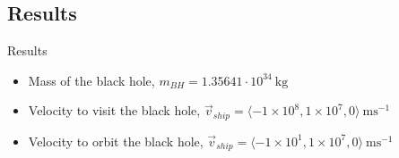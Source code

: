 




\subsection{Results}
\begin{frame}{Results}
    \begin{itemize}
    \item Mass of the black hole, \(m_{BH} = 1.35641\cdot 10^{34}\ \mathrm{kg}\)
    \item Velocity to visit the black hole, \(\vec{v}_{ship} = \langle -1 \times 10^8, 1 \times 10^7, 0 \rangle\ \mathrm{ms^{-1}}\)
    \item Velocity to orbit the black hole, \(\vec{v}_{ship} = \langle -1 \times 10^1, 1 \times 10^7, 0 \rangle\ \mathrm{ms^{-1}}\)
    \end{itemize}
\end{frame}